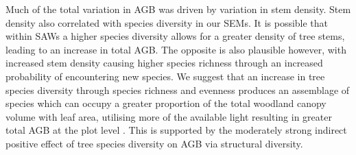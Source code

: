 \documentclass[11pt,a4paper]{article}
\begin{document}

Much of the total variation in AGB was driven by variation in stem density. Stem density also correlated with species diversity in our SEMs. It is possible that within SAWs a higher species diversity allows for a greater density of tree stems, leading to an increase in total AGB. The opposite is also plausible however, with increased stem density causing higher species richness through an increased probability of encountering new species. We suggest that an increase in tree species diversity through species richness and evenness produces an assemblage of species which can occupy a greater proportion of the total woodland canopy volume with leaf area, utilising more of the available light resulting in greater total AGB at the plot level \citep{}. This is supported by the moderately strong indirect positive effect of tree species diversity on AGB via structural diversity.



\end{document}
